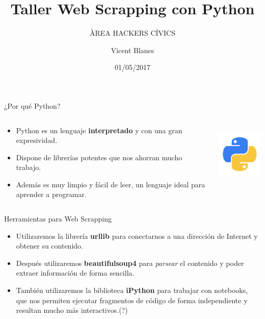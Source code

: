 \documentclass{beamer}
\title{Taller Web Scrapping con Python}
\subtitle{ÀREA HACKERS CÍVICS}
\author{Vicent Blanes}
\date{01/05/2017}
\begin{document}
	\begin{frame}
		\titlepage
	\end{frame}

	\begin{frame}{¿Por qué Python?}
		\begin{columns}[T]
			\begin{column}[T]{8cm} 
				\begin{itemize}  
					\item Python es un lenguaje \textbf{interpretado} y con una gran expresividad.
					\item Dispone de librerías potentes que nos ahorran mucho trabajo.
					\item Además es muy limpio y fácil de leer, un lenguaje ideal para aprender a programar.
				\end{itemize}
			\end{column}
		
			\begin{column}[T]{5cm}
				\includegraphics[height=3cm]{python.png}
			\end{column}
		\end{columns}
	\end{frame}
	\begin{frame}{Herramientas para Web Scrapping}
		\begin{itemize}
			\item Utilizaremos la librería \textbf{urllib} para conectarnos a una dirección de Internet y obtener su contenido.
			\item Después utilizaremos \textbf{beautifulsoup4} para \textit{parsear} el contenido y poder extraer información de forma
			sencilla.
			\item También utilizaremos la biblioteca \textbf{iPython} para trabajar con notebooks, que nos permiten ejecutar fragmentos de código de forma independiente y resultan mucho más interactivos.(?)
		\end{itemize}
	\end{frame}
\end{document}
